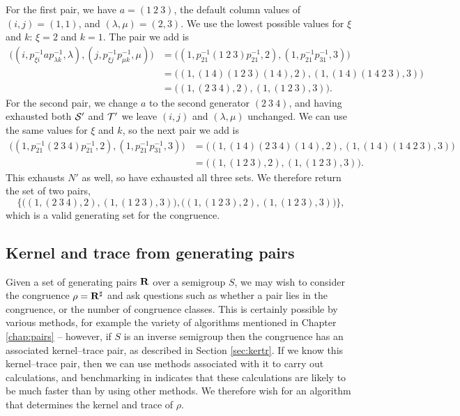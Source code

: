 \begin{example}
  For the first pair, we have $a = (1~2~3)$, the default column values of
  $(i,j)=(1,1)$, and $(\lambda,\mu)=(2,3)$.  We use the lowest possible values
  for $\xi$ and $k$: $\xi = 2$ and $k = 1$.  The pair we add is
  \begin{align*}
    \big(
      (i, p_{\xi i}^{-1}ap_{\lambda k}^{-1}, \lambda),
      (j, p_{\xi j}^{-1}p_{\mu k}^{-1}, \mu)
    \big)
    &= \big(
      (1, p_{2 1}^{-1}(1~2~3)p_{2 1}^{-1}, 2),
      (1, p_{2 1}^{-1}p_{3 1}^{-1}, 3)
    \big) \\
    &= \big(
      \left(1, (1~4)(1~2~3)(1~4), 2\right),
      \left(1, (1~4)(1~4~2~3), 3\right)
    \big) \\
    &= \big(
      \left(1, (2~3~4), 2\right),
      \left(1, (1~2~3), 3\right)
    \big).
  \end{align*}
  For the second pair, we change $a$ to the second generator $(2~3~4)$, and
  having exhausted both $\mathcal{S}'$ and $\mathcal{T}'$ we leave $(i,j)$ and $(\lambda,\mu)$
  unchanged.  We can use the same values for $\xi$ and $k$, so the next pair we
  add is
  \begin{align*}
    \big(
      (1, p_{2 1}^{-1}(2~3~4)p_{2 1}^{-1}, 2),
      (1, p_{2 1}^{-1}p_{3 1}^{-1}, 3)
    \big)
    &= \big(
      \left(1, (1~4)(2~3~4)(1~4), 2\right),
      \left(1, (1~4)(1~4~2~3), 3\right)
    \big) \\
    &= \big(
      \left(1, (1~2~3), 2\right),
      \left(1, (1~2~3), 3\right)
    \big).
  \end{align*}
  This exhausts $N'$ as well, so have exhausted all three sets.  We therefore
  return the set of two pairs,
  $$\Big\{
    \big(
      \left(1, (2~3~4), 2\right),
      \left(1, (1~2~3), 3\right)
    \big),
    \big(
      \left(1, (1~2~3), 2\right),
      \left(1, (1~2~3), 3\right)
    \big)
  \Big\},$$
  which is a valid generating set for the congruence.
\end{example}

\subsection{Kernel and trace from generating pairs}
\label{sec:pairs-to-kertr}

Given a set of generating pairs $\mathbf{R}$ over a semigroup $S$, we may wish
to consider the congruence $\rho = \mathbf{R}^\sharp$ and ask questions such as
whether a pair lies in the congruence, or the number of congruence classes.
This is certainly possible by various methods, for example the variety of
algorithms mentioned in Chapter \ref{chap:pairs} -- however, if $S$ is an inverse
semigroup then the congruence has an associated kernel--trace pair, as described
in Section \ref{sec:kertr}.  If we know this kernel--trace pair, then we can use
methods associated with it to carry out calculations, and benchmarking in
\cite[\S6.1.3]{mtorpey_msc} indicates that these calculations are likely to be
much faster than by using other methods.  We therefore wish for an algorithm
that determines the kernel and trace of $\rho$.

